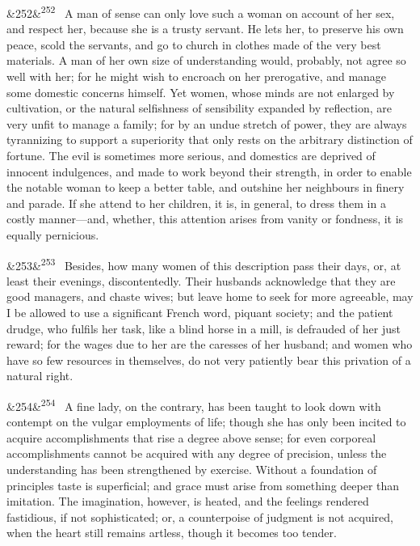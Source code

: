 \documentclass[12pt]{article}
\newcommand{\para}[1][]{\par\noindent\ifx&#1&\else\textsuperscript{\footnotesize #1}~\fi}
\begin{document}
\para[252] A man of sense can only love such a woman on account of her sex, and respect her, because she is a trusty servant. He lets her, to preserve his own peace, scold the servants, and go to church in clothes made of the very best materials. A man of her own size of understanding would, probably, not agree so well with her; for he might wish to encroach on her prerogative, and manage some domestic concerns himself. Yet women, whose minds are not enlarged by cultivation, or the natural selfishness of sensibility expanded by reflection, are very unfit to manage a family; for by an undue stretch of power, they are always tyrannizing to support a superiority that only rests on the arbitrary distinction of fortune. The evil is sometimes more serious, and domestics are deprived of innocent indulgences, and made to work beyond their strength, in order to enable the notable woman to keep a better table, and outshine her neighbours in finery and parade. If she attend to her children, it is, in general, to dress them in a costly manner---and, whether, this attention arises from vanity or fondness, it is equally pernicious.

\para[253] Besides, how many women of this description pass their days, or, at least their evenings, discontentedly. Their husbands acknowledge that they are good managers, and chaste wives; but leave home to seek for more agreeable, may I be allowed to use a significant French word, piquant society; and the patient drudge, who fulfils her task, like a blind horse in a mill, is defrauded of her just reward; for the wages due to her are the caresses of her husband; and women who have so few resources in themselves, do not very patiently bear this privation of a natural right.

\para[254] A fine lady, on the contrary, has been taught to look down with contempt on the vulgar employments of life; though she has only been incited to acquire accomplishments that rise a degree above sense; for even corporeal accomplishments cannot be acquired with any degree of precision, unless the understanding has been strengthened by exercise. Without a foundation of principles taste is superficial; and grace must arise from something deeper than imitation. The imagination, however, is heated, and the feelings rendered fastidious, if not sophisticated; or, a counterpoise of judgment is not acquired, when the heart still remains artless, though it becomes too tender.
\end{document}
